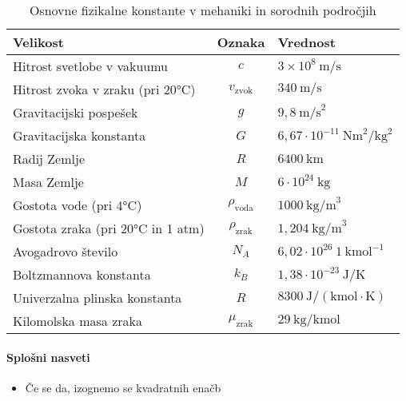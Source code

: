 \begin{table}[h!]
    \centering
    \begin{tabular}{|l|c|l|}
    \hline
    \textbf{Velikost} & \textbf{Oznaka} & \textbf{Vrednost} \\
    \hline
    Hitrost svetlobe v vakuumu & $c$ & $3 \times 10^8 \ \text{m/s}$ \\
    \hline
    Hitrost zvoka v zraku (pri 20°C) & $v_{\text{zvok}}$ & $340 \ \text{m/s}$ \\
    \hline    
    Gravitacijski pospešek & $g$ & $9{,}8 \ \text{m/s}^2$ \\
    \hline
    Gravitacijska konstanta & $G$ & \(6{,}67 \cdot 10^{-11} \ \text{Nm}^2 / \text{kg}^2\) \\
    \hline
    Radij Zemlje & $R$ & \(6400 \ \text{km}\) \\
    \hline
    Masa Zemlje & $M$ & \(6 \cdot 10^{24} \ \text{kg}\) \\
    \hline

    Gostota vode (pri 4°C) & $\rho_{\text{voda}}$ & $1000 \ \text{kg/m}^3$ \\
    \hline
    Gostota zraka (pri 20°C in 1 atm) & $\rho_{\text{zrak}}$ & $1{,}204 \ \text{kg/m}^3$ \\
    \hline
    Avogadrovo število & $N_A$ & \(6,02 \cdot 10^{26} \ 1 \ \text{kmol}^{-1}\) \\
    \hline
    Boltzmannova konstanta & $k_B$ & \(1,38 \cdot10^{-23} \ \text{J} / \text{K}\) \\
    \hline
    Univerzalna plinska konstanta & $R$ & \(8300 \ \text{J} / (\text{kmol} \cdot \text{K})\) \\
    \hline
    Kilomolska masa zraka & $\mu_\text{zrak}$ & \(29 \ \text{kg} / \text{kmol}\) \\
    \hline

    \end{tabular}
    \caption{Osnovne fizikalne konstante v mehaniki in sorodnih področjih}
\end{table}

\paragraph{Splošni nasveti}
\begin{itemize}    
    \item Če se da, izognemo se kvadratnih enačb
\end{itemize}